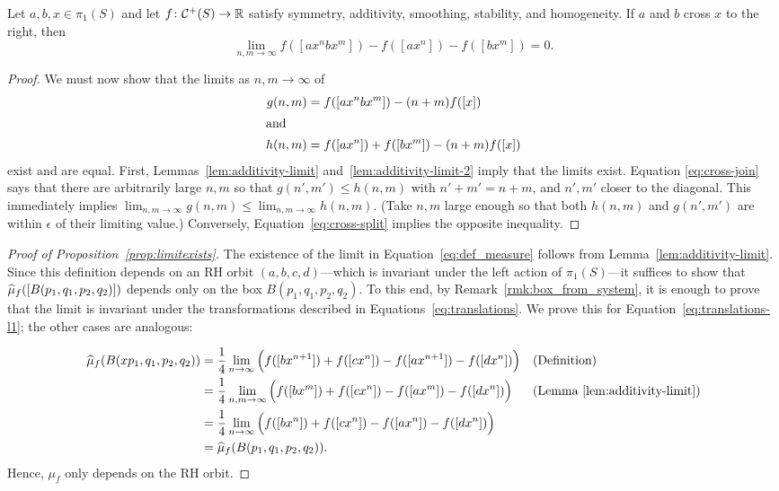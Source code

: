 \begin{proposition}\label{prop:join-split-alg}
Let $a,b,x\in \pi_1(S)$ and let $f \colon \mathcal{C}^+(S) \to \mathbb{R}$ satisfy symmetry, additivity, smoothing, stability, and homogeneity. 
If $a$ and $b$ cross $x$ to the right, then
  \[
    \lim_{n,m\to\infty} f([a x^n b x^m]) - f([ax^n]) - f([bx^m]) = 0.
  \]
\end{proposition}
\begin{proof}
  We must now show that the limits as $n,m \to \infty$ of
  \begin{align*}
    g(n,m) &= f([ax^nbx^m]) - (n+m)f([x])\\
    \shortintertext{and}
    h(n,m) &= f([ax^n]) + f([bx^m]) - (n+m)f([x])
  \end{align*}
  exist and are equal.
  First, Lemmas~\ref{lem:additivity-limit} and~\ref{lem:additivity-limit-2} imply that the limits exist. Equation \eqref{eq:cross-join} says that there are arbitrarily large $n,m$ so that $g(n',m') \le h(n,m)$ with $n'+m' = n+m$, and $n',m'$ closer to the diagonal. This immediately implies $\lim_{n,m \to\infty} g(n,m) \le \lim_{n,m\to\infty} h(n,m)$. (Take $n,m$ large enough so that both $h(n,m)$ and $g(n',m')$ are within $\epsilon$ of their limiting value.) Conversely, Equation~\eqref{eq:cross-split} implies the opposite inequality.
\end{proof}

\begin{proof}[Proof of Proposition~\ref{prop:limitexists}]
The existence of the limit in Equation~\eqref{eq:def_measure} follows from Lemma~\ref{lem:additivity-limit}.
Since this definition depends on an RH orbit $(a,b,c,d)$---which is invariant under the left action of $\pi_1(S)$---it suffices to show that $\widehat{\mu}_f([B(p_1,q_1,p_2,q_2)])$ depends only on the box $B(p_1,q_1,p_2,q_2)$.
To this end, by Remark~\ref{rmk:box_from_system}, it is enough to prove that the limit is invariant under the transformations described in Equations~\eqref{eq:translations}.
We prove this for Equation~\eqref{eq:translations-l1}; the other cases
are analogous:

\begin{align*}
\widehat{\mu}_f(B(xp_1,q_1,p_2,q_2))
&= \frac{1}{4}\lim_{n \to \infty}
\Big( f([bx^{n+1}]) + f([cx^n]) - f([ax^{n+1}]) - f([dx^n]) \Big)
&& \text{(Definition)} \\
&= \frac{1}{4}\lim_{n,m \to \infty}
\Big( f([bx^{m}]) + f([cx^n]) - f([ax^{m}]) - f([dx^n]) \Big)
&& \text{(Lemma~\ref{lem:additivity-limit})} \\
&= \frac{1}{4}\lim_{n \to \infty}
\Big( f([bx^{n}]) + f([cx^n]) - f([ax^{n}]) - f([dx^n]) \Big)
&&\\
&= \widehat{\mu}_f(B(p_1,q_1,p_2,q_2)).
\end{align*}
Hence, $\mu_f$ only depends on the RH orbit.
\end{proof}

